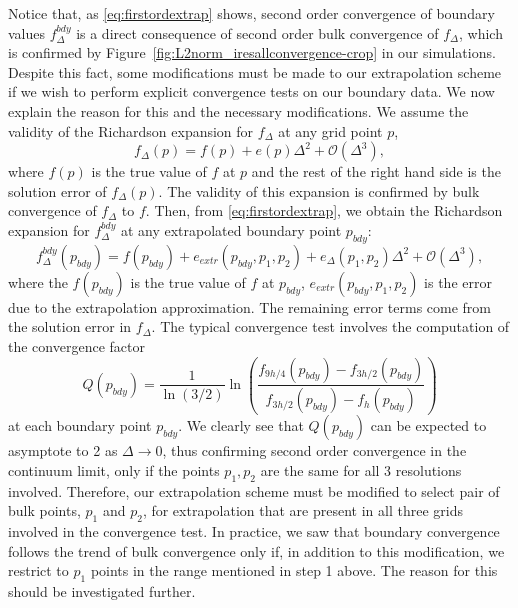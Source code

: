 \documentclass[a4paper,11pt]{article}
\numberwithin{equation}{section}
\begin{document}
Notice that, as \eqref{eq:firstordextrap} shows, second order convergence of boundary values $f^{bdy}_{\Delta}$ is a direct consequence of second order bulk convergence of $f_\Delta$, which is confirmed by Figure~\ref{fig:L2norm_iresallconvergence-crop} in our simulations. Despite this fact, some modifications must be made to our extrapolation scheme if we wish to perform explicit convergence tests on our boundary data. We now explain the reason for this and the necessary modifications. We assume the validity of the Richardson expansion \cite{doi:10.1098/rsta.1911.0009} for $f_{\Delta}$ at any grid point $p$,
\begin{equation}
\label{eq:Richexp}
f_\Delta(p)=f(p)+e(p)\Delta^2+\mathcal{O}(\Delta^3),
\end{equation}
where $f(p)$ is the true value of $f$ at $p$ and the rest of the right hand side is the solution error of $f_\Delta(p)$. The validity of this expansion is confirmed by bulk convergence of $f_\Delta$ to $f$.
Then, from \eqref{eq:firstordextrap}, we obtain the Richardson expansion for $f^{bdy}_{\Delta}$ at any extrapolated boundary point $p_{bdy}$:
 \begin{equation}
 \label{eq:bdyRichexp}
 f^{bdy}_{\Delta}(p_{bdy})=f(p_{bdy})+e_{extr}(p_{bdy},p_1,p_2)+e_\Delta(p_1,p_2)\Delta^2+\mathcal{O}(\Delta^3),
 \end{equation}
where the $f(p_{bdy})$ is the true value of $f$ at $p_{bdy}$, $e_{extr}(p_{bdy},p_1,p_2)$ is the error due to the extrapolation approximation. The remaining error terms come from the solution error in $f_\Delta$. The typical convergence test involves the computation of the convergence factor
\begin{equation}\label{eq:qconv}
Q(p_{bdy})=\frac{1}{\ln(3/2)}\ln\left( \frac{f_{9h/4}(p_{bdy})-f_{3h/2}(p_{bdy})}{f_{3h/2}(p_{bdy})-f_{h}(p_{bdy})} \right)
\end{equation}
at each boundary point $p_{bdy}$. We clearly see that $Q(p_{bdy})$ can be expected to asymptote to 2 as $\Delta\rightarrow0$, thus confirming second order convergence in the continuum limit, only if the points $p_1,p_2$ are the same for all 3 resolutions involved. Therefore, our extrapolation scheme must be modified to select pair of bulk points, $p_1$ and $p_2$, for extrapolation that are present in all three grids involved in the convergence test. 
In practice, we saw that boundary convergence follows the trend of bulk convergence only if, in addition to this modification, we restrict to $p_1$ points in the range mentioned in step 1 above. The reason for this should be investigated further. 
\end{document}
